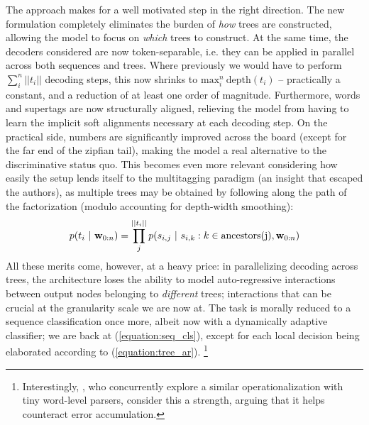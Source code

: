 The approach makes for a well motivated step in the right direction.
The new formulation completely eliminates the burden of \textit{how} trees are constructed, allowing the model to focus on \textit{which} trees to construct. 
At the same time, the decoders considered are now token-separable, i.e. they can be applied in parallel across both sequences and trees.
Where previously we would have to perform $\sum_i^n ||t_i||$ decoding steps, this now shrinks to $\mathrm{max}_i^n ~ \mathrm{depth}(t_i)$ -- practically a constant, and a reduction of at least one order of magnitude.
Furthermore, words and supertags are now structurally aligned, relieving the model from having to learn the implicit soft alignments necessary at each decoding step.
On the practical side, numbers are significantly improved across the board (except for the far end of the zipfian tail), making the model a real alternative to the discriminative status quo.
This becomes even more relevant considering how easily the setup lends itself to the multitagging paradigm (an insight that escaped the authors), as multiple trees may be obtained by following along the path of the factorization (modulo accounting for depth-width smoothing):
\begin{equation}\label{equation:tree_ar}
	p(t_i \ | \ \mathbf{w}_{0:n}) = \prod_j^{||t_i||} p(s_{i,j} \ | \ s_{i,k} : k \in \mathrm{ancestors(j)}, \mathbf{w}_{0:n})
\end{equation}
All these merits come, however, at a heavy price: in parallelizing decoding across trees, the architecture loses the ability to model auto-regressive interactions between output nodes belonging to \textit{different} trees; interactions that can be crucial at the granularity scale we are now at.
The task is morally reduced to a sequence classification once more, albeit now with a dynamically adaptive classifier; we are back at (\ref{equation:seq_cls}), except for each local decision being elaborated according to (\ref{equation:tree_ar}).%
	\footnote{Interestingly, \citet{Liu_Ji_Wu_Lan_2021}, who concurrently explore a similar operationalization with tiny word-level parsers, consider this a strength, arguing that it helps counteract error accumulation.}

